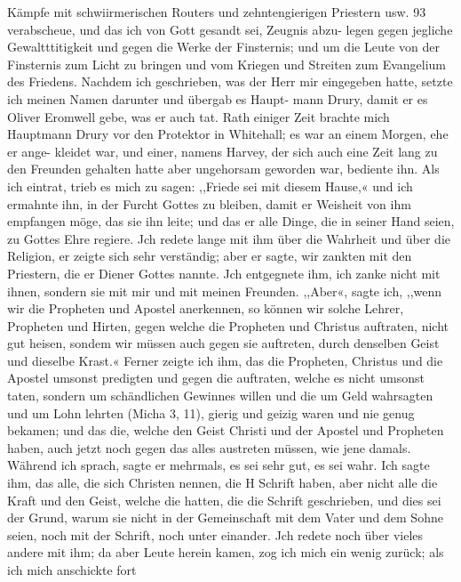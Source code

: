 Kämpfe mit schwiirmerischen Routers und zehntengierigen Priestern usw. 93
verabscheue, und das ich von Gott gesandt sei, Zeugnis abzu-
legen gegen jegliche Gewaltttitigkeit und gegen die Werke der
Finsternis; und um die Leute von der Finsternis zum Licht zu
bringen und vom Kriegen und Streiten zum Evangelium des
Friedens. Nachdem ich geschrieben, was der Herr mir eingegeben
hatte, setzte ich meinen Namen darunter und übergab es Haupt-
mann Drury, damit er es Oliver Eromwell gebe, was er auch
tat. Rath einiger Zeit brachte mich Hauptmann Drury vor den
Protektor in Whitehall; es war an einem Morgen, ehe er ange-
kleidet war, und einer, namens Harvey, der sich auch eine Zeit
lang zu den Freunden gehalten hatte aber ungehorsam geworden
war, bediente ihn. Als ich eintrat, trieb es mich zu sagen:
,,Friede sei mit diesem Hause,« und ich ermahnte ihn, in der Furcht
Gottes zu bleiben, damit er Weisheit von ihm empfangen möge,
das sie ihn leite; und das er alle Dinge, die in seiner Hand
seien, zu Gottes Ehre regiere. Jch redete lange mit ihm über
die Wahrheit und über die Religion, er zeigte sich sehr verständig;
aber er sagte, wir zankten mit den Priestern, die er Diener Gottes
nannte. Jch entgegnete ihm, ich zanke nicht mit ihnen, sondern
sie mit mir und mit meinen Freunden. ,,Aber«, sagte ich, ,,wenn
wir die Propheten und Apostel anerkennen, so können wir solche
Lehrer, Propheten und Hirten, gegen welche die Propheten und
Christus auftraten, nicht gut heisen, sondem wir müssen auch
gegen sie auftreten, durch denselben Geist und dieselbe Krast.«
Ferner zeigte ich ihm, das die Propheten, Christus und die
Apostel umsonst predigten und gegen die auftraten, welche es
nicht umsonst taten, sondern um schändlichen Gewinnes willen
und die um Geld wahrsagten und um Lohn lehrten (Micha 3, 11),
gierig und geizig waren und nie genug bekamen; und das die,
welche den Geist Christi und der Apostel und Propheten haben,
auch jetzt noch gegen das alles austreten müssen, wie jene damals.
Während ich sprach, sagte er mehrmals, es sei sehr gut, es sei
wahr. Ich sagte ihm, das alle, die sich Christen nennen, die
H Schrift haben, aber nicht alle die Kraft und den Geist, welche
die hatten, die die Schrift geschrieben, und dies sei der Grund,
warum sie nicht in der Gemeinschaft mit dem Vater und dem
Sohne seien, noch mit der Schrift, noch unter einander. Jch
redete noch über vieles andere mit ihm; da aber Leute herein
kamen, zog ich mich ein wenig zurück; als ich mich anschickte fort


